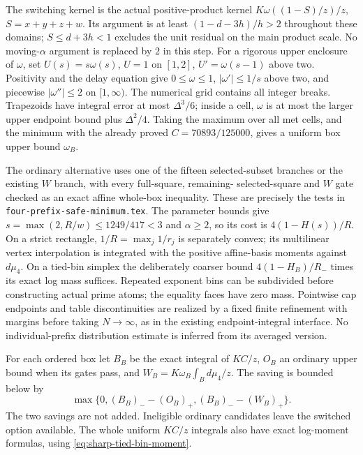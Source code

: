 The switching kernel is the actual positive-product kernel
$K\omega((1-S)/z)/z$, $S=x+y+z+w$.  Its argument is at least
$(1-d-3h)/h>2$ throughout these domains; $S\le d+3h<1$ excludes
the unit residual on the main product scale.  No moving-$\alpha$
argument is replaced by $2$ in this step.  For a rigorous upper
enclosure of $\omega$, set $U(s)=s\omega(s)$, $U=1$ on $[1,2]$,
$U'=\omega(s-1)$ above two.  Positivity and the delay equation give
$0\le\omega\le1$, $|\omega'|\le1/s$ above two, and piecewise
$|\omega''|\le2$ on $[1,\infty)$.  The numerical grid contains all
integer breaks.  Trapezoids have integral error at most $\Delta^3/6$;
inside a cell, $\omega$ is at most the larger upper endpoint bound
plus $\Delta^2/4$.  Taking the maximum over all met cells, and the
minimum with the already proved $C=70893/125000$, gives a uniform
box upper bound $\omega_B$.

The ordinary alternative uses one of the fifteen selected-subset
branches or the existing $W$ branch, with every full-square, remaining-
selected-square and $W$ gate checked as an exact affine whole-box
inequality.  These are precisely the tests in
\texttt{four-prefix-safe-minimum.tex}.  The parameter bounds give
$s=\max(2,R/w)\le1249/417<3$ and $\alpha\ge2$, so its cost is
$4(1-H(s))/R$.  On a strict rectangle, $1/R=\max_j1/r_j$ is
separately convex; its multilinear vertex interpolation is integrated
with the positive affine-basis moments against $d\mu_4$.  On a tied-bin
simplex the deliberately coarser bound $4(1-H_B)/R_-$ times its exact
log mass suffices.  Repeated exponent bins can be subdivided before
constructing actual prime atoms; the equality faces have zero mass.
Pointwise cap endpoints and table discontinuities are realized by a
fixed finite refinement with margins before taking $N\to\infty$,
as in the existing endpoint-integral interface.  No individual-prefix
distribution estimate is inferred from its averaged version.

For each ordered box let $B_B$ be the exact integral of $KC/z$,
$O_B$ an ordinary upper bound when its gates pass, and
$W_B=K\omega_B\int_Bd\mu_4/z$.  The saving is bounded below by
\begin{equation}\label{eq:sharp-four-min-saving}
 \max\{0,(B_B)_--(O_B)_+,(B_B)_--(W_B)_+\}.
\end{equation}
The two savings are not added.  Ineligible ordinary candidates leave
the switched option available.  The whole uniform $KC/z$ integrals
also have exact log-moment formulas, using \eqref{eq:sharp-tied-bin-moment}.

